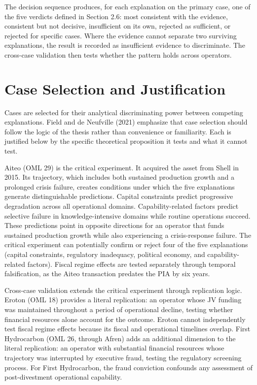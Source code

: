 The decision sequence produces, for each explanation on the primary
case, one of the five verdicts defined in Section 2.6: most consistent
with the evidence, consistent but not decisive, insufficient on its own,
rejected as sufficient, or rejected for specific cases. Where the
evidence cannot separate two surviving explanations, the result is
recorded as insufficient evidence to discriminate. The cross-case
validation then tests whether the pattern holds across operators.

\hypertarget{case-selection-and-justification}{%
\section{Case Selection and
Justification}\label{case-selection-and-justification}}

Cases are selected for their analytical discriminating power between
competing explanations. Field and de Neufville (2021) emphasize that
case selection should follow the logic of the thesis rather than
convenience or familiarity. Each is justified below by the specific
theoretical proposition it tests and what it cannot test.

Aiteo (OML 29) is the critical experiment. It acquired the asset from
Shell in 2015. Its trajectory, which includes both sustained production
growth and a prolonged crisis failure, creates conditions under which
the five explanations generate distinguishable predictions. Capital
constraints predict progressive degradation across all operational
domains. Capability-related factors predict selective failure in
knowledge-intensive domains while routine operations succeed. These
predictions point in opposite directions for an operator that funds
sustained production growth while also experiencing a crisis-response
failure. The critical experiment can potentially confirm or reject four
of the five explanations (capital constraints, regulatory inadequacy,
political economy, and capability-related factors). Fiscal regime
effects are tested separately through temporal falsification, as the
Aiteo transaction predates the PIA by six years.

Cross-case validation extends the critical experiment through
replication logic. Eroton (OML 18) provides a literal replication: an
operator whose JV funding was maintained throughout a period of
operational decline, testing whether financial resources alone account
for the outcome. Eroton cannot independently test fiscal regime effects
because its fiscal and operational timelines overlap. First Hydrocarbon
(OML 26, through Afren) adds an additional dimension to the literal
replication: an operator with substantial financial resources whose
trajectory was interrupted by executive fraud, testing the regulatory
screening process. For First Hydrocarbon, the fraud conviction confounds
any assessment of post-divestment operational capability.

